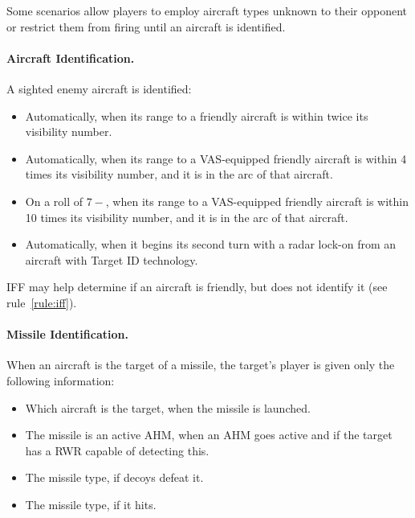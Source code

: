 \begin{advancedrules}
{Some scenarios allow players to employ aircraft types unknown to their opponent or restrict them from firing until an aircraft is identified.

\paragraph{Aircraft Identification.} A sighted enemy aircraft is identified:

\begin{itemize}

    \item Automatically, when its range to a friendly aircraft is within twice its visibility number.

    \item Automatically, when its range to a VAS-equipped friendly aircraft is within 4 times its visibility number, and it is in the  arc of that aircraft.

    \item On a roll of $7-$, when its range to a VAS-equipped friendly aircraft is within 10 times its visibility number, and it is in the  arc of that aircraft.

    \item Automatically, when it begins its second turn with a radar lock-on from an aircraft with Target ID technology.

\end{itemize}

IFF may help determine if an aircraft is friendly, but does not identify it (see rule~\ref{rule:iff}).

\paragraph{Missile Identification.} 
When an aircraft is the target of a missile, the target's player is given only the following information:


\begin{itemize}
    \item Which aircraft is the target, when the missile is launched.
    \item The missile is an active AHM, when an AHM goes active and if the target has a RWR capable of detecting this.
    \item The missile type, if decoys defeat it.
    \item The missile type, if it hits.
\end{itemize}

}
\end{advancedrules}

